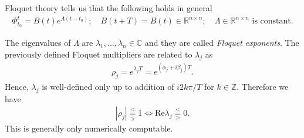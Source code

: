 Floquet theory tells us that the following holds in general
\begin{align}
	\boxed{
		\Phi_{t_0}^{t} = {B(t)} e^{\Lambda(t-t_0)};\quad B(t+T) = B(t)\in \mathbb{R}^{n\times n};\quad \Lambda \in \mathbb{R}^{n\times n}  \textrm{ is constant} .
	}
\end{align}
\begin{definition}
	The eigenvalues of $\Lambda$ are $\lambda_1,\ldots,\lambda_n\in \mathbb{C}$ and they are called \emph{Floquet exponents}. The previously defined Floquet multipliers are related to $\lambda_j$ as 
	\begin{align}
		\boxed{
			\rho_j = e^{\lambda_j T} = e^{(\alpha_j + i \beta_j)T}.
		}
	\end{align}
	Hence, $\lambda_j$ is well-defined only up to addition of $i2k\pi /T$ for $k \in \mathbb{Z}$. Therefore we have 
	\begin{align}
		|\rho_j| \underset{>}{\overset{<}{=}}1 \Leftrightarrow  \textrm{Re} \lambda _j \overset{<}{\underset{>}{=}} 0.	
	\end{align}
This is generally only numerically computable.	
\end{definition}


